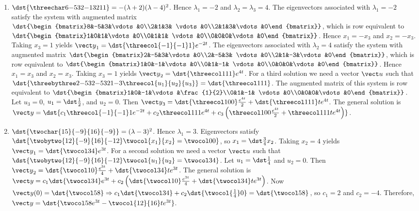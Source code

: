 \documentclass[openany]{book}
\newenvironment{sectionSolutions}{
 \begin{enumerate}[item-label={\thesection.\arabic{enumi}.}]
}{
 \end{enumerate}
}
\begin{document}
\begin{sectionSolutions}
\item
$\dst{\threechar6{-5}32{-1}3211}
=-(\lambda+2)(\lambda-4)^2$.
Hence $\lambda_1=-2$ and  $\lambda_2=\lambda_3=4$.
The eigenvectors associated
 with $\lambda_1=-2$ satisfy the system with  augmented matrix
$\dst{\begin{bmatrix}8&-5&3&\vdots&0\\2&1&3&
\vdots&0\\2&1&3&\vdots&0\end{bmatrix}}$,
which is row equivalent to
$\dst{\begin{bmatrix}1&0&1&\vdots&0\\0&1&1&
\vdots&0\\0&0&0&\vdots&0\end{bmatrix}}$.
Hence  $x_1=-x_3$ and $x_2=-x_3$.  Taking $x_3=1$
yields
${\vect y}_1=\dst{\threecol{-1}{-1}1}e^{-2t}$.
The eigenvectors associated
 with $\lambda_2=4$ satisfy the system with  augmented matrix
$\dst{\begin{bmatrix}2&-5&3&\vdots&0\\2&-5&3&
\vdots&0\\2&1&-3&\vdots&0\end{bmatrix}}$,
which is row equivalent to
$\dst{\begin{bmatrix}1&0&-1&\vdots&0\\0&1&-1&
\vdots&0\\0&0&0&\vdots&0\end{bmatrix}}$.
Hence  $x_1=x_3$ and $x_2=x_3$.  Taking $x_3=1$
yields
${\vect y}_2=\dst{\threecol111}e^{4t}$.
For a third solution we need a vector ${\vect u}$ such that
$\dst{\threebythree2{-5}32{-5}321{-3}\threecol{u_1}{u_2}{u_3}}=
\dst{\threecol111}$.
The augmented matrix of this system is row equivalent to
$\dst{\begin{bmatrix}1&0&-1&\vdots&\frac{1}{2}\\0&1&-1&
\vdots&0\\0&0&0&\vdots&0\end{bmatrix}}$.
Let $u_3=0$, $u_1=\dst\frac{1}{2}$, and $u_2=0$. Then ${\vect
y}_3=\dst{\threecol100}\frac{e^{4t}}{2}+\dst{\threecol111}te^{4t}$. The
general solution is
 ${\vect y}=\dst{
c_1\threecol{-1}{-1}1e^{-2t}+c_2\threecol111e^{4t}+c_3\left
(\threecol100\frac{e^{4t}}{2}+\threecol111te^{4t}\right)}$.


\item
$\dst{\twochar{15}{-9}{16}{-9}}=(\lambda-3)^2$.
Hence $\lambda_1=3$.
Eigenvectors   satisfy
$\dst{\twobytwo{12}{-9}{16}{-12}\twocol{x_1}{x_2}=\twocol00}$,
so $x_1=\dst\frac{3}{4}x_2$.  Taking $x_2=4$ yields
${\vect y}_1=\dst{\twocol34}e^{3t}$.
For a second solution we need a vector ${\vect u}$
such that $\dst{\twobytwo{12}{-9}{16}{-12}\twocol{u_1}{u_2}
=\twocol34}$. Let $u_1=\dst\frac{1}{4}$ and $u_2=0$. Then
${\vect y}_2=\dst{\twocol10}\frac{e^{3t}}{4}+\dst{\twocol34}te^{3t}$.
The general solution is
${\vect y}=c_1\dst{\twocol34}e^{3t}+
c_2\left(\dst{\twocol10}\frac{e^{3t}}{4}+\dst{\twocol34}te^{3t}\right)$.
Now ${\vect y}(0)=\dst{\twocol58}\Rightarrow
c_1\dst{\twocol34}+
c_2\dst{\twocol{\frac{1}{4}}0}=\dst{\twocol58}$,  so $c_1=2$
and $c_2=-4$. Therefore,
${\vect y}=\dst{\twocol58e^{3t}-\twocol{12}{16}te^{3t}}$.



\end{sectionSolutions}
\end{document}
